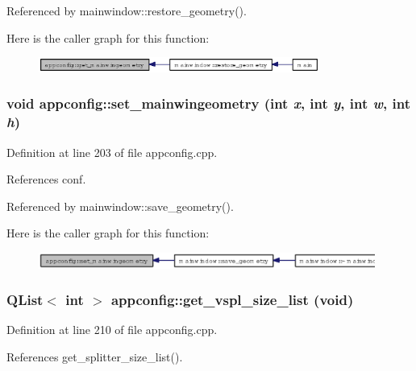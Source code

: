 Referenced by mainwindow::restore\_\-geometry().

Here is the caller graph for this function:\begin{figure}[H]
\begin{center}
\leavevmode
\includegraphics[width=261pt]{classappconfig_266005e28aa275a8df212192d9eaaf27_icgraph}
\end{center}
\end{figure}
\subsubsection{\setlength{\rightskip}{0pt plus 5cm}void appconfig::set\_\-mainwingeometry (int {\em x}, int {\em y}, int {\em w}, int {\em h})}\label{classappconfig_996f730172676a83dcf58b99f7519cf7}




Definition at line 203 of file appconfig.cpp.

References conf.

Referenced by mainwindow::save\_\-geometry().

Here is the caller graph for this function:\begin{figure}[H]
\begin{center}
\leavevmode
\includegraphics[width=313pt]{classappconfig_996f730172676a83dcf58b99f7519cf7_icgraph}
\end{center}
\end{figure}
\subsubsection{\setlength{\rightskip}{0pt plus 5cm}QList$<$ int $>$ appconfig::get\_\-vspl\_\-size\_\-list (void)}\label{classappconfig_578b013308a692c38f1c99530b8dbdd1}




Definition at line 210 of file appconfig.cpp.

References get\_\-splitter\_\-size\_\-list().

